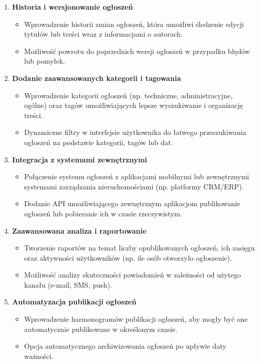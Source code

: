 \begin{enumerate}
    \item \textbf{Historia i wersjonowanie ogłoszeń}
    \begin{itemize}
        \item Wprowadzenie historii zmian ogłoszeń, która umożliwi śledzenie edycji tytułów lub treści wraz z informacjami o autorach.
        \item Możliwość powrotu do poprzednich wersji ogłoszeń w przypadku błędów lub pomyłek.
    \end{itemize}

    \item \textbf{Dodanie zaawansowanych kategorii i tagowania}
    \begin{itemize}
        \item Wprowadzenie kategorii ogłoszeń (np. techniczne, administracyjne, ogólne) oraz tagów umożliwiających lepsze wyszukiwanie i organizację treści.
        \item Dynamiczne filtry w interfejsie użytkownika do łatwego przeszukiwania ogłoszeń na podstawie kategorii, tagów lub dat.
    \end{itemize}

    \item \textbf{Integracja z systemami zewnętrznymi}
    \begin{itemize}
        \item Połączenie systemu ogłoszeń z aplikacjami mobilnymi lub zewnętrznymi systemami zarządzania nieruchomościami (np. platformy CRM/ERP).
        \item Dodanie API umożliwiającego zewnętrznym aplikacjom publikowanie ogłoszeń lub pobieranie ich w czasie rzeczywistym.
    \end{itemize}

    \item \textbf{Zaawansowana analiza i raportowanie}
    \begin{itemize}
        \item Tworzenie raportów na temat liczby opublikowanych ogłoszeń, ich zasięgu oraz aktywności użytkowników (np. ile osób otworzyło ogłoszenie).
        \item Możliwość analizy skuteczności powiadomień w zależności od użytego kanału (e-mail, SMS, push).
    \end{itemize}

    \item \textbf{Automatyzacja publikacji ogłoszeń}
    \begin{itemize}
        \item Wprowadzenie harmonogramów publikacji ogłoszeń, aby mogły być one automatycznie publikowane w określonym czasie.
        \item Opcja automatycznego archiwizowania ogłoszeń po upływie daty ważności.
    \end{itemize}


\end{enumerate}
